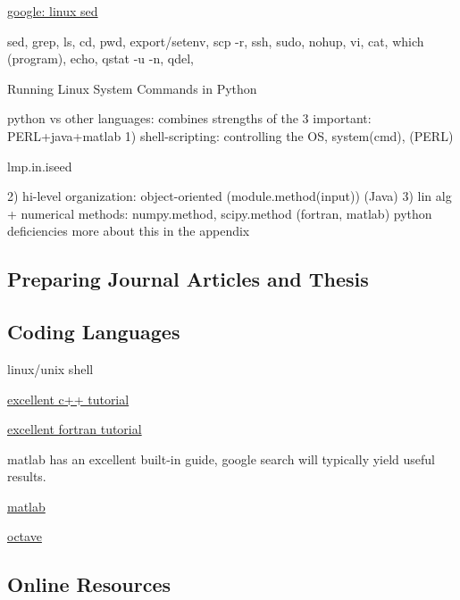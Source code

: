 \documentclass[letterpaper,12pt,amsmath,amssymb]{article}
\begin{document}
\href{https://www.google.com/search?q=linux+sed}
{google: linux sed}


sed, grep, ls, cd, pwd, export/setenv, scp -r, ssh, sudo, nohup, 
vi, cat, which (program), echo, qstat -u -n, qdel, 

Running Linux System Commands in Python
 
python vs other languages: combines strengths of the 3 important:
PERL+java+matlab
1) shell-scripting: controlling the OS, system(cmd), (PERL) 

lmp.in.iseed



2) hi-level organization: object-oriented (module.method(input)) (Java)
3) lin alg + numerical methods: numpy.method, scipy.method (fortran, matlab)
python deficiencies
more about this in the appendix

\subsection{Preparing Journal Articles and Thesis}





\subsection{Coding Languages}

linux/unix shell

\href{http://www.youtube.com/watch?v=XFQ9dw3CyDo&list=PL1D10C030FDCE7CE0}
{excellent c++ tutorial}



\href{http://www.youtube.com/watch?v=YRTEOFMUTzw&list=PL6A8E21D2E86A0155}
{excellent fortran tutorial}

matlab has an excellent built-in guide, google search will typically 
yield useful results. 

\href{http://www.gnu.org/software/octave/}
{matlab}

\href{http://www.gnu.org/software/octave/}
{octave}

\subsection{Online Resources}
\end{document}
